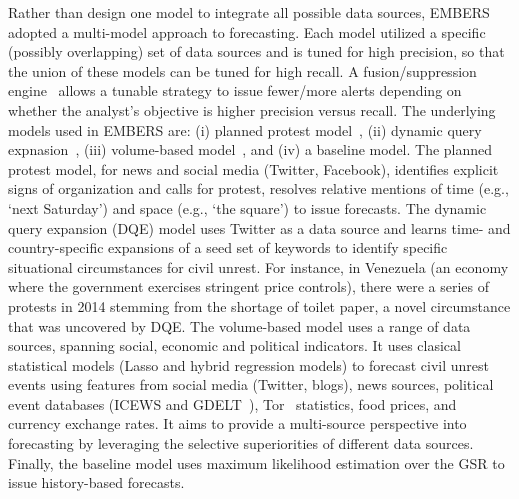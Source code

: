 Rather than design one model to integrate all possible data sources, EMBERS adopted a multi-model 
approach to forecasting. Each model utilized a specific (possibly overlapping) set of data sources
and is tuned for high precision, so that the union of these models can be tuned for high recall.
A fusion/suppression engine~\cite{andy-scotland-paper} allows a tunable strategy to issue fewer/more
alerts depending on whether the analyst's objective is higher precision versus recall. The
underlying models used in EMBERS are: (i) planned protest model~\cite{pp-paper1,pp-paper2},
(ii) dynamic query expnasion~\cite{dqe-plosone}, (iii) volume-based model~\cite{asonam},
and (iv) a baseline model. The planned protest model, for news and social media (Twitter, Facebook),
identifies explicit signs of organization and calls
for protest, resolves relative mentions of time (e.g., `next Saturday') and space (e.g., `the square')
to issue forecasts. The dynamic query expansion (DQE) model uses Twitter as a data source and learns time- and country-specific
expansions of a seed set of keywords to identify specific situational circumstances for civil unrest.
For instance, in Venezuela (an economy where the government exercises stringent price controls),
there were a series of protests in 2014 stemming from the shortage of toilet paper, a novel circumstance
that was uncovered by DQE. The volume-based model uses a range of data sources, spanning
social, economic
and political indicators. It uses clasical statistical models (Lasso
and hybrid regression models) to forecast civil unrest events using features
from social media (Twitter, blogs), news sources, 
political event databases (ICEWS and GDELT~\cite{gdelt}), Tor~\cite{tor} statistics, food prices, and currency
exchange rates. It aims to provide a multi-source perspective into forecasting by leveraging
the selective superiorities of different data sources. Finally, the baseline model uses maximum likelihood
estimation over the GSR to issue history-based forecasts.

